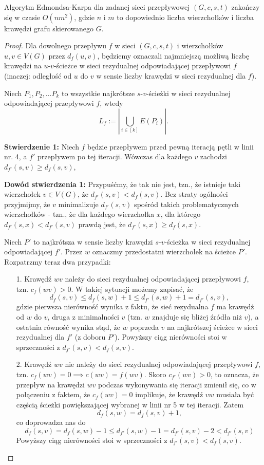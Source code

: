 \begin{theorem}
	Algorytm Edmondsa-Karpa dla zadanej sieci przepływowej $(G, c, s, t)$
	zakończy się w czasie $O(nm^2)$, gdzie $n$ i $m$ to dopowiednio
	liczba wierzchołków i liczba krawędzi grafu skierowanego $G$.
	\begin{proof}
		Dla dowolnego przepływu $f$ w sieci $(G, c, s, t)$ i wierzchołków
		$u, v \in V(G)$ przez $d_f(u, v)$, będziemy oznaczali najmniejszą
		możliwą liczbę krawędzi na $u$-$v$-ścieżce w sieci 
		rezydualnej odpowiadającej przepływowi $f$ (inaczej: odległość
		od $u$ do $v$ w sensie liczby krawędzi w sieci rezydualnej dla $f$).
		
		Niech $P_1, P_2, \dots P_k$ to wszystkie najkrótsze
		$s$-$v$-ścieżki w sieci rezydualnej odpowiadającej przepływowi
		$f$, wtedy 
		\[L_f := \left|\bigcup_{i \in [k]} E(P_i)\right|.\]
		
		\textbf{Stwierdzenie 1:} Niech $f$ będzie przepływem przed
		pewną iteracją pętli w linii nr. 4, a $f'$ przepływem 
		po tej iteracji. Wówczas
		dla każdego $v$ zachodzi $d_{f'}(s, v) \geq d_{f}(s,v)$,
		
		\textbf{Dowód stwierdzenia 1:}
		Przypuśćmy, że tak nie jest, tzn., że istnieje 
		taki wierzchołek $v \in V(G)$, że $d_{f'}(s, v) < d_f(s,v)$.
		Bez straty ogólności przyjmijmy, że $v$
		minimalizuje $d_{f'}(s,v)$ spośród takich problematycznych 
		wierzchołków - tzn., że dla każdego wierzchołka $x$, dla 
		którego $d_{f'}(s, x) < d_{f'}(s, v)$ prawdą jest, że 
		$d_{f'}(s, x) \geq d_f(s,x)$.
		
		Niech $P'$ to najkrótsza w sensie liczby krawędzi $s$-$v$-ścieżka
		w sieci rezydualnej odpowiadającej $f'$. Przez $w$ oznaczmy 
		przedostatni wierzchołek na ścieżce $P'$. Rozpatrzmy
		teraz dwa przypadki:
		\begin{itemize}
			\item[1.] Krawędź $wv$ należy do sieci rezydualnej 
			odpowiadającej
			przepływowi $f$, tzn. $c_f(wv) > 0$. W takiej 
			sytuacji możemy zapisać, że  
			\[d_f(s, v) \leq d_f(s, w) + 1 \leq d_{f'}(s, w) + 1 = d_{f'}(s, v),\]
			gdzie pierwsza nierówność wynika z faktu, że sieć rezydualna $f$
			ma krawędź od $w$ do $v$, druga z minimalności $v$ (tzn. 
			$w$ znajduje się bliżej źródła niż $v$), a ostatnia równość
			wynika stąd, że $w$ poprzeda $v$ na najkrótszej ścieżce 
			w sieci rezydualnej dla $f'$ (z doboru $P'$).
			Powyższy ciąg nierówności stoi w sprzeczności z
			$d_{f'}(s, v) < d_f(s,v)$.
			
			\item[2.] Krawędź $wv$ nie należy do sieci rezydualnej 
			odpowiadającej
			przepływowi $f$, tzn. $c_f(wv) = 0 \implies c(wv) = f(wv)$.
			Skoro  $c_{f'}(wv) > 0$, to oznacza, że przepływ na
			krawędzi $wv$ podczas wykonywania się iteracji zmienił się, 
			co w połączeniu z faktem, że  $c_f(wv) = 0$
			implikuje, że krawędź $vw$ musiała być częścią ścieżki 
			powiększającej wybranej w linii nr 5 w tej iteracji.
			Zatem 
			\[d_f(s, w) = d_f(s, v) + 1,\]
			co doprowadza nas do 
			\[d_f(s, v) = d_f(s,w) - 1 \leq
			d_{f'}(s,w) -1 = d_{f'}(s,v    ) - 2 < d_{f'}(s,v)\]
			Powyższy ciąg nierówności stoi w sprzeczności z
			$d_{f'}(s, v) < d_f(s,v)$.
		\end{itemize}
		

\end{proof}
\end{theorem}
